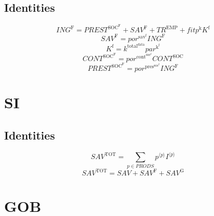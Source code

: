 \subsection{Identities}

\begin{equation}
{I\!N\!G}^{\mathrm{F}} = {P\!R\!E\!S\!T}^{\mathrm{SOC}^{\mathrm{F}}} + {S\!A\!V}^{\mathrm{F}} + {T\!R}^{\mathrm{EMP}} + {{f\!i\!t}} {p^{\mathrm{k}}} {K^{\mathrm{f}}}
\end{equation}
\begin{equation}
{S\!A\!V}^{\mathrm{F}} = {{p\!o\!r}^{\mathrm{sav}^{\mathrm{f}}}} {{I\!N\!G}^{\mathrm{F}}}
\end{equation}
\begin{equation}
K^{\mathrm{f}} = {k^{\mathrm{total}^{\mathrm{data}}}} {{p\!a\!r}^{\mathrm{k}^{\mathrm{f}}}}
\end{equation}
\begin{equation}
{C\!O\!N\!T}^{\mathrm{SOC}^{\mathrm{F}}} = {{p\!o\!r}^{\mathrm{cont}^{\mathrm{soc}^{\mathrm{f}}}}} {{C\!O\!N\!T}^{\mathrm{SOC}}}
\end{equation}
\begin{equation}
{P\!R\!E\!S\!T}^{\mathrm{SOC}^{\mathrm{F}}} = {{p\!o\!r}^{\mathrm{pres}^{\mathrm{soc}^{\mathrm{f}}}}} {{I\!N\!G}^{\mathrm{F}}}
\end{equation}




\section{SI}

\subsection{Identities}

\begin{equation}
{S\!A\!V}^{\mathrm{TOT}} = \sum_{p\in {P\!R\!O\!D\!S}} {{p}^{\langle p\rangle}} {{I}^{\langle p\rangle}}
\end{equation}
\begin{equation}
{S\!A\!V}^{\mathrm{TOT}} = {S\!A\!V} + {S\!A\!V}^{\mathrm{F}} + {S\!A\!V}^{\mathrm{G}}
\end{equation}




\section{GOB}

